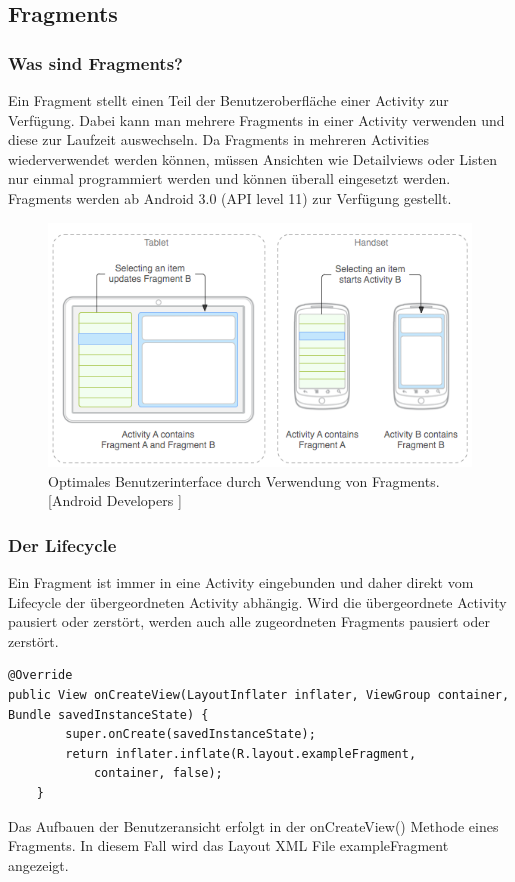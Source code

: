 \documentclass[FIPLY_base.tex]{subfiles}
\begin{document}
\subsection{Fragments}
\subsubsection{Was sind Fragments?}
Ein Fragment stellt einen Teil der Benutzeroberfläche einer Activity zur Verfügung. Dabei kann man mehrere Fragments in einer Activity verwenden und diese zur Laufzeit auswechseln.
Da Fragments in mehreren Activities wiederverwendet werden können, müssen Ansichten wie Detailviews oder Listen nur einmal programmiert werden und können überall eingesetzt werden.
Fragments werden ab Android 3.0 (API level 11) zur Verfügung gestellt. 

\begin{figure}[H]
\includegraphics[scale=0.60]{img/fragments_modules}
\caption{Optimales Benutzerinterface durch Verwendung von Fragments. 
[Android Developers \cite{adFragmentsGuide}]}
\end{figure}
\newpage
\subsubsection{Der Lifecycle}
Ein Fragment ist immer in eine Activity eingebunden und daher direkt vom Lifecycle der übergeordneten Activity abhängig.
Wird die übergeordnete Activity pausiert oder zerstört, werden auch alle zugeordneten Fragments pausiert oder zerstört. 

\begin{lstlisting}[caption={onCreateView() das ein Fragment anzeigt},label=DescriptiveLabel]
@Override
public View onCreateView(LayoutInflater inflater, ViewGroup container, Bundle savedInstanceState) {
        super.onCreate(savedInstanceState);
        return inflater.inflate(R.layout.exampleFragment, 
        	container, false);
    }
\end{lstlisting}
Das Aufbauen der Benutzeransicht erfolgt in der onCreateView() Methode eines Fragments. In diesem Fall wird das Layout XML File exampleFragment angezeigt.
\end{document}
